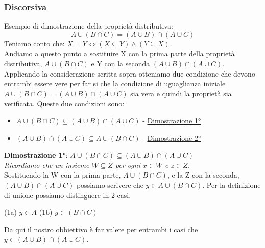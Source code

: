 \subsubsection{Discorsiva}
Esempio di dimostrazione della proprietà distributiva:
\begin{equation}
	A \cup (B \cap C) = (A \cup B) \cap (A \cup C)
\end{equation}
Teniamo conto che: $X = Y \iff (X \subseteq Y) \land (Y \subseteq X)$.\\
Andiamo a questo punto a sostituire X con la prima parte della proprietà distributiva, $A \cup (B \cap C)$ e Y con la seconda $(A \cup B) \cap (A \cup C)$. 
Applicando la considerazione scritta sopra otteniamo due condizione che devono entrambi essere vere per far si che la condizione di uguaglianza iniziale $A \cup (B \cap C) = (A \cup B) \cap (A \cup C)$ sia vera e quindi la proprietà sia verificata. Queste due condizioni sono:
\begin{itemize}
    \item $A \cup (B \cap C) \subseteq (A \cup B) \cap (A \cup C)$ - \underline{Dimostrazione 1°}
    \item $(A \cup B) \cap (A \cup C) \subseteq A \cup (B \cap C)$ - \underline{Dimostrazione 2°}
\end{itemize}
\textbf{Dimostrazione 1°}: $A \cup (B \cap C) \subseteq (A \cup B) \cap (A \cup C)$\\
\textit{Ricordiamo che un insieme $W \subseteq Z$ per ogni $x \in W$ e $z \in Z$.}\\
Sostituendo la W con la prima parte, $A \cup (B \cap C)$, e la Z con la seconda, $(A \cup B) \cap (A \cup C)$ possiamo scrivere che $y \in A \cup (B \cap C)$. Per la definizione di unione possiamo distinguere in 2 casi.
\begin{center}
    (1a) $y \in A$ \hspace{.5cm}  (1b) $y \in (B \cap C)$ \\
\end{center}
Da qui il nostro obbiettivo è far valere per entrambi i casi che $y \in (A \cup B) \cap (A \cup C)$.
